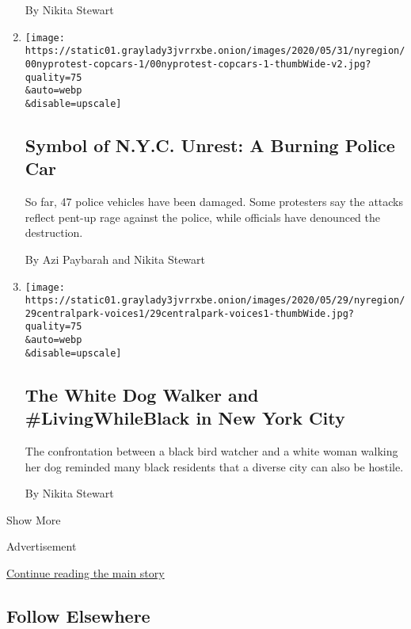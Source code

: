 \begin{enumerate}
  By Nikita Stewart
\item
  \href{/2020/05/31/nyregion/police-cars-nyc-protests.html}{}

  \texttt{[image: https://static01.graylady3jvrrxbe.onion/images/2020/05/31/nyregion/00nyprotest-copcars-1/00nyprotest-copcars-1-thumbWide-v2.jpg?quality=75\\\&auto=webp\\\&disable=upscale]}

  \hypertarget{symbol-of-nyc-unrest-a-burning-police-car}{%
  \subsection{Symbol of N.Y.C. Unrest: A Burning Police
  Car}\label{symbol-of-nyc-unrest-a-burning-police-car}}

  So far, 47 police vehicles have been damaged. Some protesters say the
  attacks reflect pent-up rage against the police, while officials have
  denounced the destruction.

  By Azi Paybarah and Nikita Stewart
\item
  \href{/2020/05/30/nyregion/central-park-video.html}{}

  \texttt{[image: https://static01.graylady3jvrrxbe.onion/images/2020/05/29/nyregion/29centralpark-voices1/29centralpark-voices1-thumbWide.jpg?quality=75\\\&auto=webp\\\&disable=upscale]}

  \hypertarget{the-white-dog-walker-and-livingwhileblack-in-new-york-city}{%
  \subsection{The White Dog Walker and \#LivingWhileBlack in New York
  City}\label{the-white-dog-walker-and-livingwhileblack-in-new-york-city}}

  The confrontation between a black bird watcher and a white woman
  walking her dog reminded many black residents that a diverse city can
  also be hostile.

  By Nikita Stewart
\end{enumerate}

Show More

Advertisement

\protect\hyperlink{after-mid2}{Continue reading the main story}

\hypertarget{follow-elsewhere}{%
\subsection{Follow Elsewhere}\label{follow-elsewhere}}

